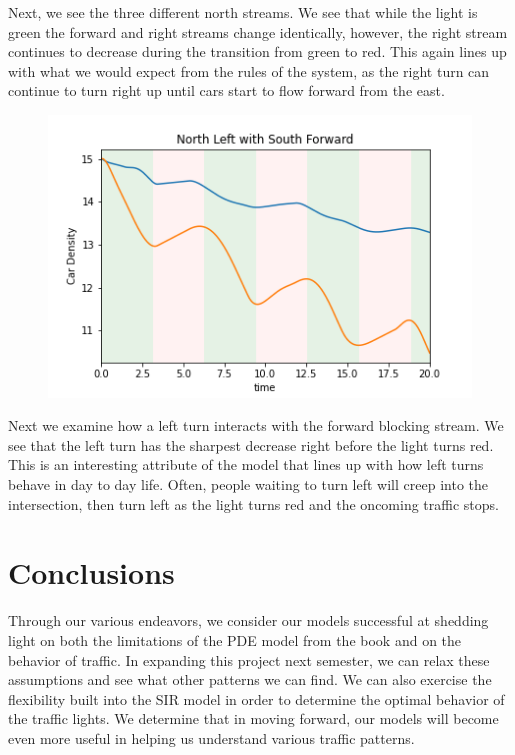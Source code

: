 \documentclass[12pt]{article}
\begin{document}
    Next, we see the three different north streams. We see that while the light is green the forward and right streams change identically, however, the right stream continues to decrease during the transition from green to red. This again lines up with what we would expect from the rules of the system, as the right turn can continue to turn right up until cars start to flow forward from the east.\\
    
    \begin{figure}[h!]
        \centering
        \includegraphics[width=12cm]{figures/NorthLeftwithSouthForward.png}
        \label{fig:NorthLeftwithSouthForward}
    \end{figure}
    
    Next we examine how a left turn interacts with the forward blocking stream. We see that the left turn has the sharpest decrease right before the light turns red. This is an interesting attribute of the model that lines up with how left turns behave in day to day life. Often, people waiting to turn left will creep into the intersection, then turn left as the light turns red and the oncoming traffic stops.\\
    
    \section{Conclusions}
    Through our various endeavors, we consider our models successful at shedding light on both the limitations of the PDE model from the book and on the behavior of traffic. 
    In expanding this project next semester, we can relax these assumptions and see what other patterns we can find. We can also exercise the flexibility built into the SIR model in order to determine the optimal behavior of the traffic lights. 
    We determine that in moving forward, our models will become even more useful in helping us understand various traffic patterns.
    
\end{document}
